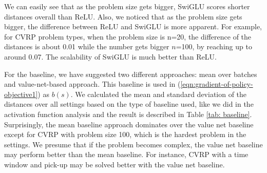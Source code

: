 \documentclass{article}
\begin{document}
We can easily see that as the problem size gets bigger, SwiGLU scores shorter distances overall than ReLU. Also, we noticed that as the problem size gets bigger, the difference between ReLU and SwiGLU is more apparent. For example, for CVRP problem types, when the problem size is n=20, the difference of the distances is about 0.01 while the number gets bigger $n$=100, by reaching up to around 0.07. The scalability of SwiGLU is much better than ReLU.

For the baseline, we have suggested two different approaches: mean over batches and value-net-based approach. This baseline is used in (\ref{eqn:gradient-of-policy-objective1}) as $b(s)$. We calculated the mean and standard deviation of the distances over all settings based on the type of baseline used, like we did in the activation function analysis and the result is described in Table \ref{tab: baseline}. Surprisingly, the mean baseline approach dominates over the value net baseline except for CVRP with problem size 100, which is the hardest problem in the settings. We presume that if the problem becomes complex, the value net baseline may perform better than the mean baseline. For instance, CVRP with a time window and pick-up may be solved better with the value net baseline.

\begin{table}[htbp]
  \centering
  \caption{Aggregated results of baselines}
  \label{tab: baseline}%
\end{table}%
\end{document}
